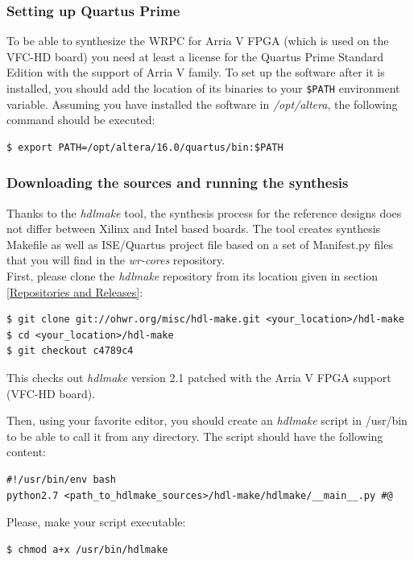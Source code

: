 \documentclass[a4paper, 12pt]{article}
\begin{document}
\subsubsection{Setting up Quartus Prime}
\label{Setting up Quartus Prime}
To be able to synthesize the WRPC for Arria V FPGA (which is used on the VFC-HD
board) you need at least a license for the Quartus Prime Standard Edition with
the support of Arria V family. To set up the software after it is installed, you
should add the location of its binaries to your \texttt{\$PATH} environment
variable. Assuming you have installed the software in \textit{/opt/altera}, the
following command should be executed:
\begin{lstlisting}
$ export PATH=/opt/altera/16.0/quartus/bin:$PATH
\end{lstlisting}

\subsubsection{Downloading the sources and running the synthesis}
Thanks to the \textit{hdlmake} tool, the synthesis process for the reference
designs does not differ between Xilinx and Intel based boards. The tool creates
synthesis Makefile as well as ISE/Quartus project file based on a set of
Manifest.py files that you will find in the \textit{wr-cores} repository.\\

First, please clone the \textit{hdlmake} repository from its location given in
section \ref{Repositories and Releases}:
\begin{lstlisting}
$ git clone git://ohwr.org/misc/hdl-make.git <your_location>/hdl-make
$ cd <your_location>/hdl-make
$ git checkout c4789c4
\end{lstlisting}
This checks out \textit{hdlmake} version 2.1 patched with the Arria V FPGA
support (VFC-HD board).

Then, using your favorite editor, you should create an \textit{hdlmake} script in
/usr/bin to be able to call it from any directory. The script should have the
following content:
\begin{lstlisting}
#!/usr/bin/env bash
python2.7 <path_to_hdlmake_sources>/hdl-make/hdlmake/__main__.py #@
\end{lstlisting}

Please, make your script executable:
\begin{lstlisting}
$ chmod a+x /usr/bin/hdlmake
\end{lstlisting}
\end{document}
